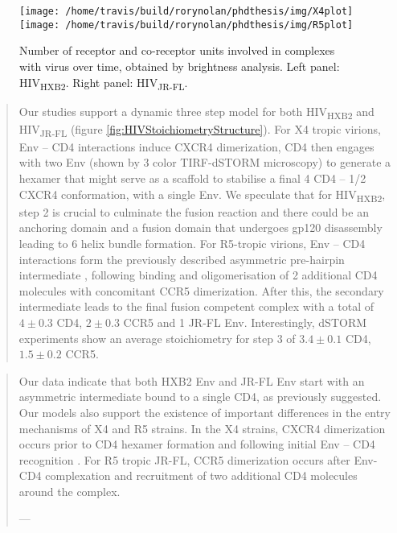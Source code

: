 \documentclass[12pt,]{book}
\theoremstyle{definition}
\theoremstyle{definition}
\theoremstyle{definition}
\theoremstyle{remark}
\begin{document}
\begin{figure}

\texttt{[image: /home/travis/build/rorynolan/phdthesis/img/X4plot]} \texttt{[image: /home/travis/build/rorynolan/phdthesis/img/R5plot]} \hfill{}

\caption{Number of receptor and co-receptor
units involved in complexes with virus over time, obtained by brightness
analysis. Left panel: HIV\textsubscript{HXB2}. Right panel:
HIV\textsubscript{JR-FL}.}\label{fig:HIVStoichiometryPlots}
\end{figure}

\begin{quote}
Our studies support a dynamic three step model for both
HIV\textsubscript{HXB2} and HIV\textsubscript{JR-FL} (figure
\ref{fig:HIVStoichiometryStructure}). For X4 tropic virions, Env -- CD4
interactions induce CXCR4 dimerization, CD4 then engages with two Env
(shown by 3 color TIRF-dSTORM microscopy) to generate a hexamer that
might serve as a scaffold to stabilise a final 4 CD4 -- 1/2 CXCR4
conformation, with a single Env. We speculate that for
HIV\textsubscript{HXB2}, step 2 is crucial to culminate the fusion
reaction and there could be an anchoring domain and a fusion domain that
undergoes gp120 disassembly leading to 6 helix bundle formation. For
R5-tropic virions, Env -- CD4 interactions form the previously described
asymmetric pre-hairpin intermediate \citep{Munro} \citep{DoKwon}
\citep{Ma}, following binding and oligomerisation of 2 additional CD4
molecules with concomitant CCR5 dimerization. After this, the secondary
intermediate leads to the final fusion competent complex with a total of
\(4\pm 0.3\) CD4, \(2\pm 0.3\) CCR5 and 1 JR-FL Env. Interestingly,
dSTORM experiments show an average stoichiometry for step 3 of
\(3.4\pm 0.1\) CD4, \(1.5\pm 0.2\) CCR5.
\end{quote}

\begin{quote}
Our data indicate that both HXB2 Env and JR-FL Env start with an
asymmetric intermediate bound to a single CD4, as previously suggested.
Our models also support the existence of important differences in the
entry mechanisms of X4 and R5 strains. In the X4 strains, CXCR4
dimerization \citep{Tan} \citep{Qin} occurs prior to CD4 hexamer
formation and following initial Env -- CD4 recognition \citep{Liu}. For
R5 tropic JR-FL, CCR5 dimerization \citep{Qin} occurs after Env-CD4
complexation and recruitment of two additional CD4 molecules \citep{Wu}
around the complex.

--- \citet{HIVstoichiometry}
\end{quote}
\end{document}
